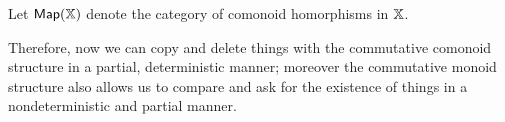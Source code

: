 \begin{definition}
Let ${\sf Map}(\mathbb{X})$ denote the category of comonoid homorphisms in $\mathbb{X}$.
\end{definition}
Therefore, now we can copy and delete things with the commutative comonoid structure in a partial, deterministic manner; moreover the commutative monoid structure also allows us to  compare and ask for the existence of things in a nondeterministic and partial manner.


